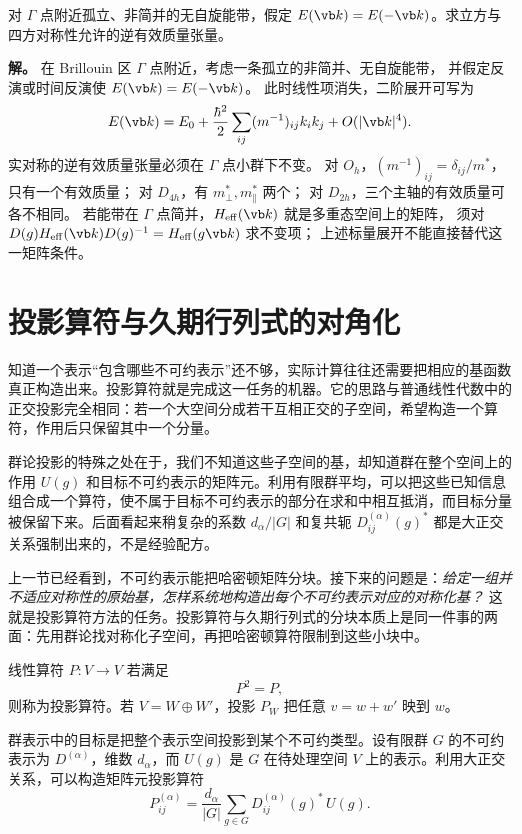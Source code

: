 \begin{example}
对 $\Gamma$ 点附近孤立、非简并的无自旋能带，假定 $E(\vb k)=E(-\vb k)$。求立方与四方对称性允许的逆有效质量张量。

\textbf{解。} 在 Brillouin 区 $\Gamma$ 点附近，考虑一条孤立的非简并、无自旋能带，
并假定反演或时间反演使 $E(\vb k)=E(-\vb k)$。
此时线性项消失，二阶展开可写为
\[
E(\vb k)=E_0+\frac{\hbar^2}{2}\sum_{ij}(m^{-1})_{ij}k_i k_j
+O(|\vb k|^4).
\]
实对称的逆有效质量张量必须在 $\Gamma$ 点小群下不变。
对 $O_h$，$(m^{-1})_{ij}=\delta_{ij}/m^*$，只有一个有效质量；
对 $D_{4h}$，有 $m_\perp^*,m_\parallel^*$ 两个；
对 $D_{2h}$，三个主轴的有效质量可各不相同。
若能带在 $\Gamma$ 点简并，$H_{\rm eff}(\vb k)$ 就是多重态空间上的矩阵，
须对 $D(g)H_{\rm eff}(\vb k)D(g)^{-1}=H_{\rm eff}(g\vb k)$ 求不变项；
上述标量展开不能直接替代这一矩阵条件。
\end{example}

\section{投影算符与久期行列式的对角化}
\label{sec:projection-secular}

知道一个表示“包含哪些不可约表示”还不够，实际计算往往还需要把相应的基函数真正构造出来。投影算符就是完成这一任务的机器。它的思路与普通线性代数中的正交投影完全相同：若一个大空间分成若干互相正交的子空间，希望构造一个算符，作用后只保留其中一个分量。

群论投影的特殊之处在于，我们不知道这些子空间的基，却知道群在整个空间上的作用 $U(g)$ 和目标不可约表示的矩阵元。利用有限群平均，可以把这些已知信息组合成一个算符，使不属于目标不可约表示的部分在求和中相互抵消，而目标分量被保留下来。后面看起来稍复杂的系数 $d_\alpha/|G|$ 和复共轭 $D^{(\alpha)}_{ij}(g)^*$ 都是大正交关系强制出来的，不是经验配方。

上一节已经看到，不可约表示能把哈密顿矩阵分块。接下来的问题是：\emph{给定一组并不适应对称性的原始基，怎样系统地构造出每个不可约表示对应的对称化基？} 这就是投影算符方法的任务。投影算符与久期行列式的分块本质上是同一件事的两面：先用群论找对称化子空间，再把哈密顿算符限制到这些小块中。

\begin{definition}[投影算符]
线性算符 $P:V\to V$ 若满足
\[
P^2=P,
\]
则称为投影算符。若 $V=W\oplus W'$，投影 $P_W$ 把任意 $v=w+w'$ 映到 $w$。
\label{def:projector}
\end{definition}

群表示中的目标是把整个表示空间投影到某个不可约类型。设有限群 $G$ 的不可约表示为 $D^{(\alpha)}$，维数 $d_\alpha$，而 $U(g)$ 是 $G$ 在待处理空间 $V$ 上的表示。利用大正交关系，可以构造矩阵元投影算符
\[
P_{ij}^{(\alpha)}
=\frac{d_\alpha}{|G|}
\sum_{g\in G}
D_{ij}^{(\alpha)}(g)^*\,U(g).
\label{eq:matrix-unit-projector}
\]

